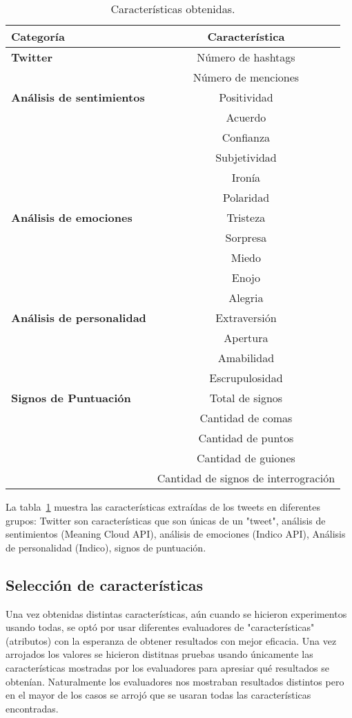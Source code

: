 \documentclass[runningheads]{llncs}
\begin{document}
\begin{table}
\centering
\caption{Características obtenidas.}\label{tab1}
\begin{tabular}{|l|c|}
\hline
Categoría & Característica\\
\hline
{\bfseries Twitter} & Número de hashtags  \\
    & Número de menciones  \\
\hline
{\bfseries Análisis de sentimientos} & Positividad\\
    & Acuerdo \\
    & Confianza  \\
    & Subjetividad  \\
    & Ironía  \\
    & Polaridad \\
\hline
{\bfseries Análisis de emociones} & Tristeza \\
    & Sorpresa \\
    & Miedo  \\
    & Enojo \\
    & Alegria \\
\hline
{\bfseries Análisis de personalidad} & Extraversión\\
    & Apertura \\
    & Amabilidad \\
    & Escrupulosidad \\
\hline
{\bfseries Signos de Puntuación} & Total de signos\\
    & Cantidad de comas\\
    & Cantidad de puntos\\
    & Cantidad de guiones\\
    & Cantidad de signos de interrogración\\
\hline
\end{tabular}
\end{table}

La tabla~\ref{tab1} muestra las características extraídas de los tweets en diferentes grupos: Twitter son características que son únicas de un "tweet", análisis de sentimientos (Meaning Cloud API), análisis de emociones (Indico API), Análisis de personalidad (Indico), signos de puntuación.


\subsection{Selección de características}
Una vez obtenidas distintas características, aún cuando se hicieron experimentos usando todas, se optó por usar diferentes evaluadores de "características" (atributos) con la esperanza de obtener resultados con mejor eficacia. Una vez arrojados los valores se hicieron distitnas pruebas usando únicamente las características mostradas por los evaluadores para apresiar qué resultados se obtenían. Naturalmente los evaluadores nos mostraban resultados distintos pero en el mayor de los casos se arrojó que se usaran todas las características encontradas.
\end{document}
